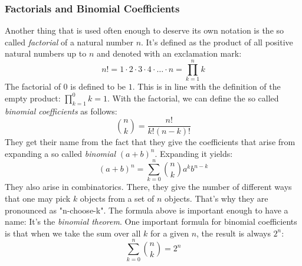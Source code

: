 \subsubsection{Factorials and Binomial Coefficients}
\label{Sec:FactorialsAndBinomCoeffs}
Another thing that is used often enough to deserve its own notation is the so called \emph{factorial} of a natural number $n$. It's defined as the product of all positive natural numbers up to $n$ and denoted with an exclamation mark:
\begin{equation}
 n! = 1 \cdot 2 \cdot 3 \cdot 4 \cdot \ldots \cdot n = \prod_{k=1}^{n} k
\end{equation}
The factorial of $0$ is defined to be $1$. This is in line with the definition of the empty product: $\prod_{k=1}^{0} k = 1$. With the factorial, we can define the so called \emph{binomial coefficients} as follows:
\begin{equation}
\label{Eq:BinomialCoeffs}
 \binom{n}{k} = \frac{n!}{k! (n-k)!}
\end{equation}
They get their name from the fact that they give the coefficients that arise from expanding a so called \emph{binomial} $(a+b)^n$. Expanding it yields:
\begin{equation}
\label{Eq:BinomialTheorem}
(a+b)^n = \sum_{k=0}^{n} \binom{n}{k} a^k b^{n-k}
\end{equation}
They also arise in combinatorics. There, they give the number of different ways that one may pick $k$ objects from a set of $n$ objects. That's why they are pronounced as "n-choose-k". The formula above is important enough to have a name: It's the \emph{binomial theorem}. One important formula for binomial coefficients is that when we take the sum over all $k$ for a given $n$, the result is always $2^n$:
\begin{equation}
\label{Eq:BinomialCoeffsSum}
\sum_{k=0}^n \binom{n}{k} = 2^n
\end{equation}


